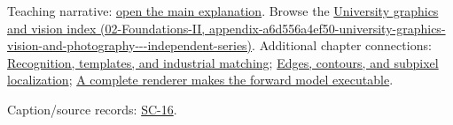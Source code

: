 Teaching narrative: \hyperref[04-visual-computing-ii-ch031-self-supervision-and-evaluation]{open the main explanation}. Browse the \href{../02-Foundations-II/main.pdf\#nameddest=appendix-a6d556a4ef50-university-graphics-vision-and-photography---independent-series}{University graphics and vision index (02-Foundations-II, appendix-a6d556a4ef50-university-graphics-vision-and-photography-\/-\/-independent-series)}. Additional chapter connections: \hyperref[04-visual-computing-ii-ch030-recognition-templates-and-industrial-matching]{Recognition, templates, and industrial matching}; \hyperref[04-visual-computing-ii-ch030-edges-contours-and-subpixel-localization]{Edges, contours, and subpixel localization}; \hyperref[04-visual-computing-ii-ch035-a-complete-renderer-makes-the-forward-model-executable]{A complete renderer makes the forward model executable}.

Caption/source records: \hyperref[04-visual-computing-ii-ch036-sc-16---stanford-cs231n-deep-learning-for-computer-vision-spring-2025-lecture-16-vision-and-language]{SC-16}.
